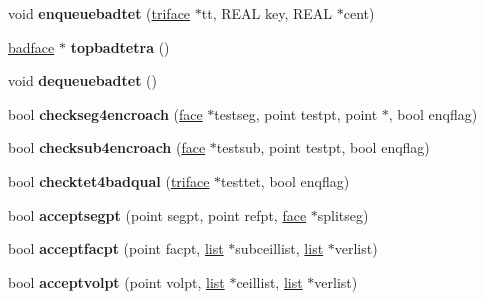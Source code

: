 \begin{DoxyCompactItemize}
\item 
\hypertarget{classtetgenmesh_aa93e8f45ad6f13b5f910d2d1636aae28}{void {\bfseries enqueuebadtet} (\hyperlink{classtetgenmesh_1_1triface}{triface} $\ast$tt, R\-E\-A\-L key, R\-E\-A\-L $\ast$cent)}\label{classtetgenmesh_aa93e8f45ad6f13b5f910d2d1636aae28}

\item 
\hypertarget{classtetgenmesh_a29e121f468c772ba16e775473ec7012c}{\hyperlink{structtetgenmesh_1_1badface}{badface} $\ast$ {\bfseries topbadtetra} ()}\label{classtetgenmesh_a29e121f468c772ba16e775473ec7012c}

\item 
\hypertarget{classtetgenmesh_a337025a60d56c5d3b382dadccab02101}{void {\bfseries dequeuebadtet} ()}\label{classtetgenmesh_a337025a60d56c5d3b382dadccab02101}

\item 
\hypertarget{classtetgenmesh_a6fb63520d61e970dada9266e41e77c71}{bool {\bfseries checkseg4encroach} (\hyperlink{classtetgenmesh_1_1face}{face} $\ast$testseg, point testpt, point $\ast$, bool enqflag)}\label{classtetgenmesh_a6fb63520d61e970dada9266e41e77c71}

\item 
\hypertarget{classtetgenmesh_ab0db65100d60e061359026257e5e23d8}{bool {\bfseries checksub4encroach} (\hyperlink{classtetgenmesh_1_1face}{face} $\ast$testsub, point testpt, bool enqflag)}\label{classtetgenmesh_ab0db65100d60e061359026257e5e23d8}

\item 
\hypertarget{classtetgenmesh_a72f21c6b3e9574d3bd9fde2f7d25fdf6}{bool {\bfseries checktet4badqual} (\hyperlink{classtetgenmesh_1_1triface}{triface} $\ast$testtet, bool enqflag)}\label{classtetgenmesh_a72f21c6b3e9574d3bd9fde2f7d25fdf6}

\item 
\hypertarget{classtetgenmesh_a6e7de3442429453c6066e35a2d9f2a4e}{bool {\bfseries acceptsegpt} (point segpt, point refpt, \hyperlink{classtetgenmesh_1_1face}{face} $\ast$splitseg)}\label{classtetgenmesh_a6e7de3442429453c6066e35a2d9f2a4e}

\item 
\hypertarget{classtetgenmesh_aa7cc66ff4ccd06d1056f644a18435255}{bool {\bfseries acceptfacpt} (point facpt, \hyperlink{classtetgenmesh_1_1list}{list} $\ast$subceillist, \hyperlink{classtetgenmesh_1_1list}{list} $\ast$verlist)}\label{classtetgenmesh_aa7cc66ff4ccd06d1056f644a18435255}

\item 
\hypertarget{classtetgenmesh_a816770f8bbf3aed54f4dd4a25b783037}{bool {\bfseries acceptvolpt} (point volpt, \hyperlink{classtetgenmesh_1_1list}{list} $\ast$ceillist, \hyperlink{classtetgenmesh_1_1list}{list} $\ast$verlist)}\label{classtetgenmesh_a816770f8bbf3aed54f4dd4a25b783037}


\end{DoxyCompactItemize}
